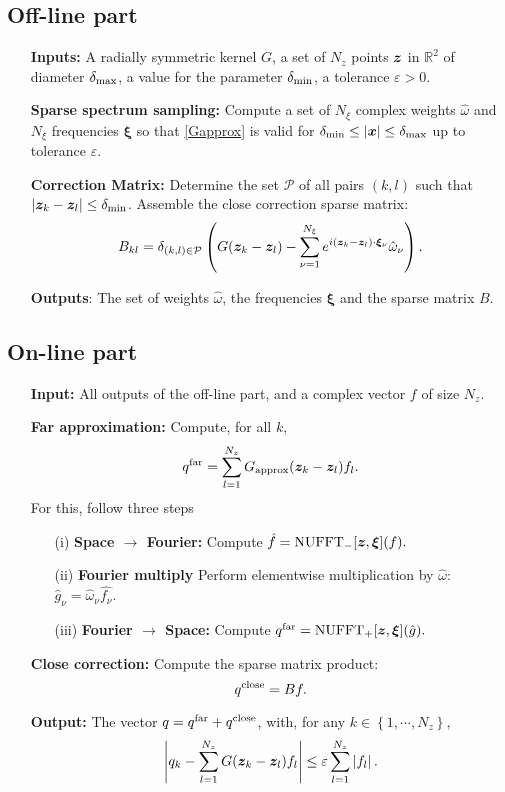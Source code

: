 \documentclass[11pt,a4paper]{article}
\begin{document}
\subsection*{Off-line part}
\begin{itemize}
	\item[]\textbf{Inputs:} A radially symmetric kernel $G$, a set of $N_z$ points $\boldsymbol{z}$ in $\mathbb{R}^2$ of diameter $\delta_{\max}$, a value for the parameter $\delta_{\min}$, a tolerance $\varepsilon > 0$.
	\item[]\textbf{Sparse spectrum sampling:} Compute a set of $N_\xi$ complex weights $\hat{\omega}$ and $N_\xi$ frequencies $\boldsymbol{\xi}$ so that \eqref{Gapprox} is valid for $\delta_{\min} \leq |\boldsymbol{x}| \leq \delta_{\max}$ up to tolerance $\varepsilon$. 
	\item[]\textbf{Correction Matrix:} Determine the set $\mathcal{P}$ of all pairs $(k,l)$ such that $\left\lvert \boldsymbol{z}_k - \boldsymbol{z}_l \right\rvert \leq \delta_{\min}$. Assemble the close correction sparse matrix:
	      \[B_{kl} = \delta_{(k,l) \in \mathcal{P}} \left( G({\boldsymbol{z}_k - \boldsymbol{z}_l}) - \sum_{\nu = 1}^{N_{\xi}}e^{i (\boldsymbol{z}_k - \boldsymbol{z}_l)\cdot \boldsymbol{\xi}_\nu} \hat{\omega}_\nu\right).\]
	\item[] \textbf{Outputs}: The set of weights $\hat{\omega}$, the frequencies $\boldsymbol{\xi}$ and the sparse matrix $B$. 
\end{itemize}
	
\subsection*{On-line part}
	
\begin{itemize}
	\item[] \textbf{Input:} All outputs of the off-line part, and a complex vector $f$ of size $N_z$. 
	\item[] \textbf{Far approximation:} Compute, for all $k$, 
	      \[ q^{\text{far}} = \sum_{l=1}^{N_z} G_{\textup{approx}}(\boldsymbol{z}_k - \boldsymbol{z}_l) f_l.\]
	      For this, follow three steps
	      \begin{itemize}
	      	\item[(i)] \textbf{Space $\rightarrow$ Fourier: } Compute $\hat{f} = \textup{NUFFT}_-[\boldsymbol{z},\boldsymbol{\xi}](f).$
	      	\item[(ii)] \textbf{Fourier multiply} Perform elementwise multiplication by $\hat{\omega}$: $\hat{g}_{\nu} = \hat{\omega}_\nu \hat{f_\nu}.$
	      	\item[(iii)] \textbf{Fourier $\rightarrow$ Space: } Compute $q^{\text{far}} =  \textup{NUFFT}_+[\boldsymbol{z},\boldsymbol{\xi}](\hat{g}).$
	      \end{itemize}
	\item[] \textbf{Close correction:} Compute the sparse matrix product:
	      \[q^{\textup{close}} = Bf.\]
	\item[] \textbf{Output:} The vector $q = q^{\textup{far}} + q^{\textup{close}}$, with, for any $k \in \left\{1,\cdots,N_z\right\},$	
	      \[ \left\lvert q_k - \sum_{l = 1}^{N_z} G({\boldsymbol{z}_k - \boldsymbol{z}_l}) f_l \right\rvert \leq \varepsilon \sum_{l=1}^{N_z} \left\lvert f_l \right\rvert.\]
\end{itemize}
\end{document}
